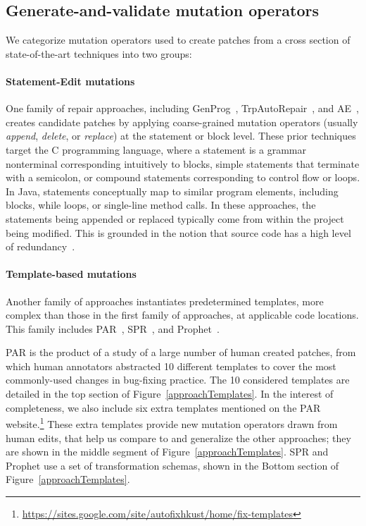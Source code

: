 \documentclass[conference]{IEEEtran}
\begin{document}
\subsection{Generate-and-validate mutation operators} 
\label{categorization}

We categorize mutation operators used to create patches from a cross
section of state-of-the-art techniques into two groups: 

\paragraph{Statement-Edit mutations}
One family of repair approaches, including GenProg~\cite{legoues12}, 
TrpAutoRepair~\cite{Qi13TrpAutoR}, and AE~\cite{Weimer13},
creates candidate 
patches by applying coarse-grained mutation operators (usually \emph{append}, \emph{delete}, or 
\emph{replace}) at the statement or block level. These prior techniques target the C programming language, where
a statement is a grammar nonterminal corresponding intuitively to blocks,
simple statements that terminate
with a semicolon, or compound statements corresponding to control flow or
loops. In Java, statements conceptually map to similar program elements, including blocks,  while loops, or single-line
method calls. In these approaches, the statements being appended or replaced
typically come from within the project being modified. This is grounded in the
notion that source code has a high level of
redundancy~\cite{Hindle12Naturalness}. 

\paragraph{Template-based mutations}
Another family of approaches instantiates
predetermined templates, more complex than those in the first family of
approaches, at applicable code locations.  This family includes PAR~\cite{kim2013}, 
SPR~\cite{fan15SPR}, and 
Prophet~\cite{long16proph}.

PAR is the product of a study of a large number of 
human 
created patches, from which human annotators abstracted 10 different templates to cover
the most commonly-used changes in bug-fixing practice.
The 10 considered templates are detailed in the top section of Figure~\ref{approachTemplates}. In the interest of completeness, we also include six extra templates 
mentioned on the PAR website.\footnote{\url{https://sites.google.com/site/autofixhkust/home/fix-templates}} 
These extra templates provide new mutation operators drawn from human edits,
that help us compare to and
generalize the other approaches; they are shown in the middle segment of
Figure~\ref{approachTemplates}. 
SPR and Prophet use a set of transformation schemas,
shown in the Bottom section of Figure~\ref{approachTemplates}.
\end{document}
